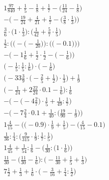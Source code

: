 \documentclass[8pt]{article}
\begin{document}
\begin{align}
1\frac{97}{840} + \frac{1}{5} - \frac{1}{8} + \frac{1}{7} - \big(\frac{11}{24} - \frac{1}{8}\big) \\
-\Big(-\frac{19}{24} + \frac{4}{21} + \frac{1}{7} - \big(\frac{3}{8} \cdot \frac{1}{3}\big)\Big) \\
\frac{3}{6} \cdot \big(1 \cdot \frac{1}{3}\big) : \big(\frac{1}{42} + \frac{5}{7} \cdot \frac{1}{5}\big) \\
\frac{1}{2} : \bigg(\Big(-\big(-\frac{1}{20}\big)\Big) : \Big(\big(-0.1\big)\Big)\bigg) \\
-\Big(-1\frac{1}{6} + \frac{1}{2} \cdot \frac{1}{2} - \big(-\frac{1}{6}\big)\Big) \\
\big(-\frac{1}{5} : \frac{1}{5} : \frac{1}{6}\big) \cdot \big(-\frac{1}{6}\big) \\
\Big(-33\frac{3}{9} \cdot \big(-\frac{2}{5} + \frac{1}{2}\big) \cdot \frac{1}{3}\Big) + \frac{1}{9} \\
\big(-\frac{1}{24} + 2\frac{22}{24} \cdot 0.1 - \frac{1}{6}\big) : \frac{1}{6} \\
-\Big(-\big(-4\frac{2}{7}\big) \cdot \frac{1}{5} + \frac{1}{49} : \frac{1}{7}\Big) \\
-\Big(-7\frac{2}{4} \cdot 0.1 + \frac{1}{40} : \big(\frac{19}{90} - \frac{1}{9}\big)\Big) \\
1\frac{4}{15} - \Big(\big(-0.9\big) \cdot \frac{1}{9} + \frac{1}{5}\Big) - \Big(\frac{4}{15} - 0.1\Big) \\
\frac{1}{36} : \frac{1}{4} : \big(\frac{9}{315} \cdot \frac{1}{9} : \frac{1}{7} : \frac{1}{5}\big) \\
1\frac{4}{45} + \frac{1}{54} : \frac{1}{6} - \Big(\frac{1}{30} : \big(1 \cdot \frac{1}{6}\big)\Big) \\
\frac{11}{30} - \big(\frac{11}{30} - \frac{1}{6}\big) : \big(-\frac{11}{30} + \frac{1}{5} + \frac{1}{3}\big) \\
7\frac{1}{2} + \frac{1}{3} + \frac{1}{6} \cdot \big(-\frac{3}{16} + \frac{1}{4} : \frac{1}{2}\big)
\end{align}
\end{document}

